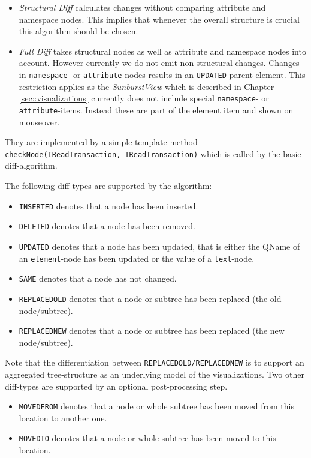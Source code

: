 \begin{itemize}
\item \emph{Structural Diff} calculates changes without comparing attribute and namespace nodes. This implies that whenever the overall structure is crucial this algorithm should be chosen.
\item \emph{Full Diff} takes structural nodes as well as attribute and namespace nodes into account. However currently we do not emit non-structural changes. Changes in \texttt{namespace}- or \texttt{attribute}-nodes results in an \texttt{UPDATED} parent-element. This restriction applies as the \emph{SunburstView} which is described in Chapter \ref{sec::visualizations} currently does not include special \texttt{namespace}- or \texttt{attribute}-items. Instead these are part of the element item and shown on mouseover.
\end{itemize}
They are implemented by a simple template method\\ \texttt{checkNode(IReadTransaction, IReadTransaction)} which is called by the basic diff-algorithm.

The following diff-types are supported by the algorithm:

\begin{itemize}
\item \texttt{INSERTED} denotes that a node has been inserted.
\item \texttt{DELETED} denotes that a node has been removed.
\item \texttt{UPDATED} denotes that a node has been updated, that is either the QName of an \texttt{element}-node has been updated or the value of a \texttt{text}-node.
\item \texttt{SAME} denotes that a node has not changed.
\item \texttt{REPLACEDOLD} denotes that a node or subtree has been replaced (the old node/subtree).
\item \texttt{REPLACEDNEW} denotes that a node or subtree has been replaced (the new node/subtree).
\end{itemize}

Note that the differentiation between \texttt{REPLACEDOLD/REPLACEDNEW} is to support an aggregated tree-structure as an underlying model of the visualizations. Two other diff-types are supported by an optional post-processing step.

\begin{itemize}
\item \texttt{MOVEDFROM} denotes that a node or whole subtree has been moved from this location to another one.
\item \texttt{MOVEDTO} denotes that a node or whole subtree has been moved to this location.
\end{itemize}

